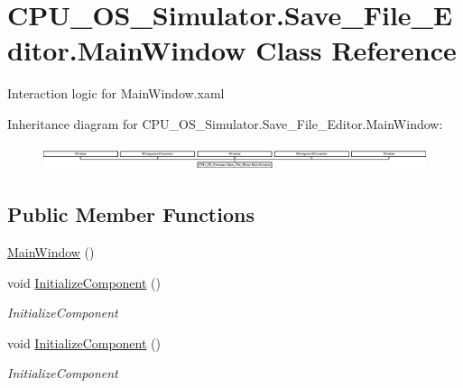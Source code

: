 \hypertarget{class_c_p_u___o_s___simulator_1_1_save___file___editor_1_1_main_window}{}\section{C\+P\+U\+\_\+\+O\+S\+\_\+\+Simulator.\+Save\+\_\+\+File\+\_\+\+Editor.\+Main\+Window Class Reference}
\label{class_c_p_u___o_s___simulator_1_1_save___file___editor_1_1_main_window}


Interaction logic for Main\+Window.\+xaml  


Inheritance diagram for C\+P\+U\+\_\+\+O\+S\+\_\+\+Simulator.\+Save\+\_\+\+File\+\_\+\+Editor.\+Main\+Window\+:\begin{figure}[H]
\begin{center}
\leavevmode
\includegraphics[height=0.732026cm]{class_c_p_u___o_s___simulator_1_1_save___file___editor_1_1_main_window}
\end{center}
\end{figure}
\subsection*{Public Member Functions}
\begin{DoxyCompactItemize}
\item 
\hyperlink{class_c_p_u___o_s___simulator_1_1_save___file___editor_1_1_main_window_a1049033cf55e7d851b9bd7ca5509cb78}{Main\+Window} ()
\item 
void \hyperlink{class_c_p_u___o_s___simulator_1_1_save___file___editor_1_1_main_window_af61976250d5217da1d50aa79a06b98a9}{Initialize\+Component} ()
\begin{DoxyCompactList}\small\item\em Initialize\+Component \end{DoxyCompactList}\item 
void \hyperlink{class_c_p_u___o_s___simulator_1_1_save___file___editor_1_1_main_window_af61976250d5217da1d50aa79a06b98a9}{Initialize\+Component} ()
\begin{DoxyCompactList}\small\item\em Initialize\+Component \end{DoxyCompactList}\end{DoxyCompactItemize}
